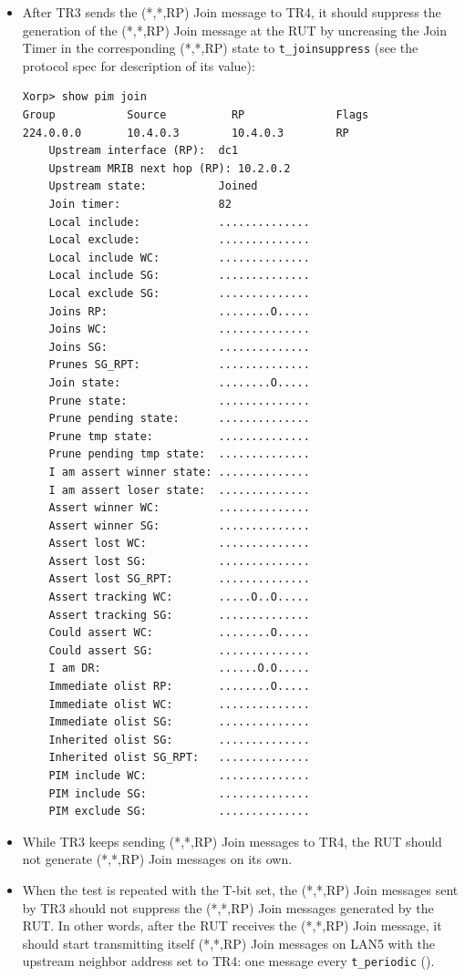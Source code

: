 \documentclass[11pt]{report}
\begin{document}
\begin{itemize}
  \item After TR3 sends the (*,*,RP) Join message to TR4, it should suppress
  the generation of the (*,*,RP) Join message at the RUT by uncreasing the
  Join Timer in the corresponding (*,*,RP) state to \verb=t_joinsuppress=
  (see the protocol spec for description of its value):

\begin{verbatim}
Xorp> show pim join 
Group           Source          RP              Flags
224.0.0.0       10.4.0.3        10.4.0.3        RP   
    Upstream interface (RP):  dc1
    Upstream MRIB next hop (RP): 10.2.0.2
    Upstream state:           Joined 
    Join timer:               82
    Local include:            ..............
    Local exclude:            ..............
    Local include WC:         ..............
    Local include SG:         ..............
    Local exclude SG:         ..............
    Joins RP:                 ........O.....
    Joins WC:                 ..............
    Joins SG:                 ..............
    Prunes SG_RPT:            ..............
    Join state:               ........O.....
    Prune state:              ..............
    Prune pending state:      ..............
    Prune tmp state:          ..............
    Prune pending tmp state:  ..............
    I am assert winner state: ..............
    I am assert loser state:  ..............
    Assert winner WC:         ..............
    Assert winner SG:         ..............
    Assert lost WC:           ..............
    Assert lost SG:           ..............
    Assert lost SG_RPT:       ..............
    Assert tracking WC:       .....O..O.....
    Assert tracking SG:       ..............
    Could assert WC:          ........O.....
    Could assert SG:          ..............
    I am DR:                  ......O.O.....
    Immediate olist RP:       ........O.....
    Immediate olist WC:       ..............
    Immediate olist SG:       ..............
    Inherited olist SG:       ..............
    Inherited olist SG_RPT:   ..............
    PIM include WC:           ..............
    PIM include SG:           ..............
    PIM exclude SG:           ..............
\end{verbatim}

  \item While TR3 keeps sending (*,*,RP) Join messages to TR4, the RUT should
  not generate (*,*,RP) Join messages on its own.

  \item When the test is repeated with the T-bit set, the (*,*,RP) Join
  messages sent by TR3 should not suppress the (*,*,RP) Join messages
  generated by the RUT. In other words, after the RUT receives the (*,*,RP)
  Join message, it should start transmitting itself (*,*,RP) Join messages on
  LAN5 with the upstream neighbor address set to TR4: one message every
  \verb=t_periodic= ({\PimsmTPeriodic}).

\end{itemize}
\end{document}
